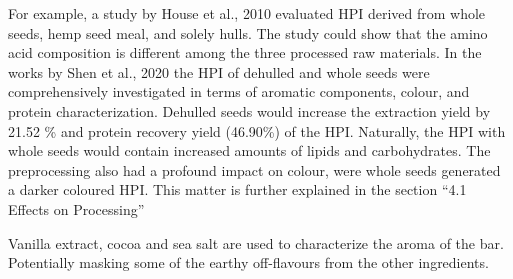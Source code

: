 \vspace{1em}
For example, a study by House et al., 2010 evaluated HPI derived from whole seeds, hemp seed meal, and solely hulls. The study could show that the amino acid composition is different among the three processed raw materials. In the works by Shen et al., 2020 the HPI of dehulled and whole seeds were comprehensively investigated in terms of aromatic components, colour, and protein characterization. Dehulled seeds would increase the extraction yield by 21.52 \% and protein recovery yield (46.90\%) of the HPI. Naturally, the HPI with whole seeds would contain increased amounts of lipids and carbohydrates. The preprocessing also had a profound impact on colour, were whole seeds generated a darker coloured HPI. This matter is further explained in the section “4.1 Effects on Processing”

\vspace{1em}
Vanilla extract, cocoa and sea salt are used to characterize the aroma of the bar. Potentially masking some of the earthy off-flavours from the other ingredients. 


